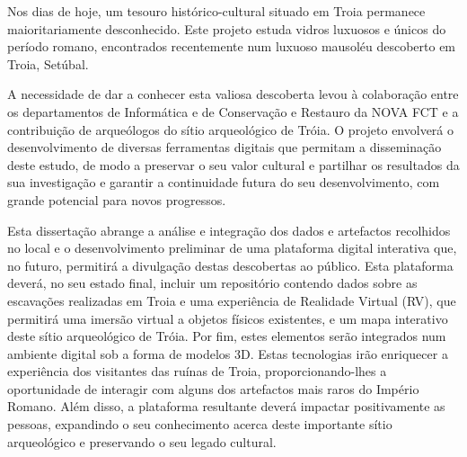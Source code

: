 
%

Nos dias de hoje, um tesouro histórico-cultural situado em Troia permanece maioritariamente desconhecido.  
Este projeto estuda vidros luxuosos e únicos do período romano, encontrados recentemente num luxuoso mausoléu descoberto em Troia, Setúbal.


A necessidade de dar a conhecer esta valiosa descoberta levou à colaboração entre os departamentos de Informática e de Conservação e Restauro da NOVA FCT e a contribuição de arqueólogos do sítio arqueológico de Tróia. O projeto envolverá o desenvolvimento de diversas ferramentas digitais que permitam a disseminação deste estudo, de modo a preservar o seu valor cultural e partilhar os resultados da sua investigação
e garantir a continuidade futura do seu desenvolvimento, com grande potencial para novos progressos.

Esta dissertação abrange a análise e integração dos dados e artefactos recolhidos no local e o desenvolvimento preliminar de uma plataforma digital interativa que, no futuro, permitirá a divulgação destas descobertas ao público.
Esta plataforma deverá, no seu estado final, incluir um repositório contendo dados sobre as escavações realizadas em Troia e uma experiência de Realidade Virtual (RV), que permitirá uma imersão virtual a objetos físicos existentes, e um mapa interativo deste sítio arqueológico de Tróia. 
Por fim, estes elementos serão integrados num ambiente digital sob a forma de modelos 3D.
Estas tecnologias irão enriquecer a experiência dos visitantes das ruínas de Troia, proporcionando-lhes a oportunidade de interagir com alguns dos artefactos mais raros do Império Romano. 
Além disso, a plataforma resultante deverá impactar positivamente as pessoas, expandindo o seu conhecimento acerca deste importante sítio arqueológico e preservando o seu legado cultural.


